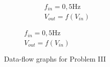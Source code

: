 \documentclass{article}
\begin{document}
\begin{figure}
\begin{subfigure}[b]{0.3\textwidth}
\begin{subfigure}[b]{\textwidth}
			\caption{\centering $f_{in}=\mathrm{0,5 Hz}$\\$V_{out}=f(V_{in})$}
			\label{fig:fastXY}
		\end{subfigure}
	\end{subfigure}	
	\caption{Data-flow graphs for Problem III}
\end{figure}

\end{document}
